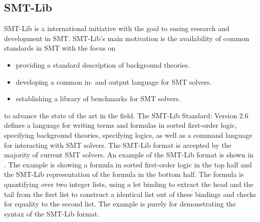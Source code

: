 \subsection{SMT-Lib}
SMT-Lib is a international initiative with the goal to easing
research and development in SMT.
SMT-Lib's main motivation is the availability of common standards in SMT
with the focus on
\begin{itemize}
    \item providing a standard description of background theories.
    \item developing a common in- and output language for SMT solvers.
    \item establishing a library of benchmarks for SMT solvers.
\end{itemize}
to advance the state of the art in the field.
The SMT-Lib Standard: Version 2.6~\cite{smtlib} defines a language for
writing terms and formulas in sorted first-order logic,
specifying background theories,
specifying logics,
as well as a command language for interacting with SMT solvers.
The SMT-Lib format is accepted by the majority of current SMT solvers.
An example of the SMT-Lib format is shown in .
The example is showing a formula in sorted first-order logic in the top half
and the SMT-Lib representation of the formula in the bottom half.
The formula is quantifying over two integer lists,
using a let binding to extract the head and the tail from the first list
to construct a identical list out of these bindings and checks for equality to the second list.
The example is purely for demonstrating the syntax of the SMT-Lib format.

